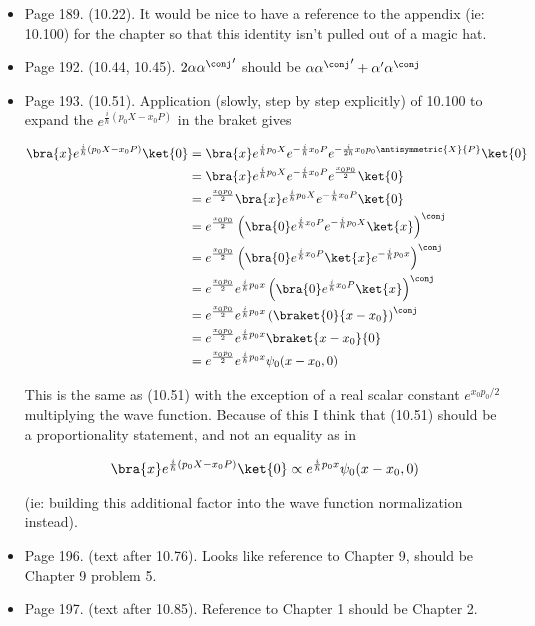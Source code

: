 \begin{itemize}
\item Page 189.  (10.22).  It would be nice to have a reference to the appendix (ie: 10.100) for the chapter so that this identity isn't pulled out of a magic hat.
\item Page 192.  (10.44, 10.45).  $2 \alpha {\alpha^\conj}'$ should be $\alpha {\alpha^\conj}' + \alpha' \alpha^\conj$
\item Page 193.  (10.51).  Application (slowly, step by step explicitly) of 10.100 to expand the $e^{\frac{i}{\hbar}(p_0 X - x_0 P)}$ in the braket gives

\begin{align*}
\bra{x} e^{\frac{i}{\hbar}(p_0 X - x_0 P)} \ket{0}
&=
\bra{x} e^{\frac{i}{\hbar}p_0 X }
e^{-\frac{i}{\hbar}x_0 P}
e^{-\frac{i}{2\hbar}x_0 p_0 \antisymmetric{X}{P}}
\ket{0} \\
&=
\bra{x} e^{\frac{i}{\hbar}p_0 X }
e^{-\frac{i}{\hbar}x_0 P}
e^{\frac{x_0 p_0}{2} }
\ket{0} \\
&=
e^{\frac{x_0 p_0}{2} }
\bra{x} e^{\frac{i}{\hbar}p_0 X} 
e^{-\frac{i}{\hbar}x_0 P}
\ket{0} \\
&=
e^{\frac{x_0 p_0}{2} }
\left(
\bra{0} 
e^{\frac{i}{\hbar}x_0 P}
e^{-\frac{i}{\hbar}p_0 X} 
\ket{x}\right)^\conj \\
&=
e^{\frac{x_0 p_0}{2} }
\left(
\bra{0} 
e^{\frac{i}{\hbar}x_0 P}
\ket{x}
e^{-\frac{i}{\hbar}p_0 x} 
\right)^\conj \\
&=
e^{\frac{x_0 p_0}{2} } e^{\frac{i}{\hbar}p_0 x} 
\left(
\bra{0} 
e^{\frac{i}{\hbar}x_0 P}
\ket{x}
\right)^\conj \\
&=
e^{\frac{x_0 p_0}{2} } e^{\frac{i}{\hbar}p_0 x} 
\left(
\braket{0}{x - x_0}
\right)^\conj \\
&=
e^{\frac{x_0 p_0}{2} } e^{\frac{i}{\hbar}p_0 x} 
\braket{x - x_0}{0} \\
&=
e^{\frac{x_0 p_0}{2} } e^{\frac{i}{\hbar}p_0 x} 
\psi_0(x - x_0, 0)
\end{align*}

This is the same as (10.51) with the exception of a real scalar constant $e^{ x_0 p_0/2}$ multiplying the wave function.  Because of this I think that (10.51) should be a proportionality statement, and not an equality as in

\begin{align*}
\bra{x} e^{\frac{i}{\hbar}(p_0 X - x_0 P)} \ket{0} \propto
e^{\frac{i}{\hbar}p_0 x} \psi_0(x - x_0, 0)
\end{align*}

(ie: building this additional factor into the wave function normalization instead).
\item Page 196.  (text after 10.76).  Looks like reference to Chapter 9, should be Chapter 9 problem 5.

\item Page 197.  (text after 10.85).  Reference to Chapter 1 should be Chapter 2.

\end{itemize}

\EndArticle

